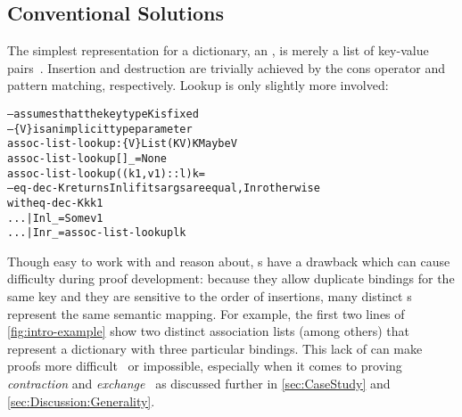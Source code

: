\subsection{Conventional Solutions}




The simplest representation for a dictionary, an \emph{\sal}, is merely a list of key-value pairs~\citep[Lists]{Pierce:SF1}.
%
Insertion and destruction are trivially achieved by the cons operator and pattern matching, respectively.
%
Lookup is only slightly more involved:
%
\begin{alltt}
  -- assumes that the key type K is fixed
  -- \altFAll\{V\} is an implicit type parameter
  assoc-list-lookup : \altFAll\{V\} \altRArr List (K \altTimes V) \altRArr K \altRArr Maybe V
  assoc-list-lookup [] \_ = None
  assoc-list-lookup ((k1 , v1) :: l) k =
    -- eq-dec-K returns Inl if its args are equal, Inr otherwise
    with eq-dec-K k k1
  ... | Inl \_ = Some v1
  ... | Inr \_ = assoc-list-lookup l k
\end{alltt}

Though easy to work with and reason about, \sal{}s have a drawback which can cause difficulty during proof development:
%
because they allow duplicate bindings for the same key and they are sensitive to the order of insertions, many distinct \sal{}s represent the same semantic mapping.
%
For example, the first two lines of \autoref{fig:intro-example}
%
show two distinct association lists (among others) that represent a dictionary with three particular bindings.
%
This lack of \firstUseGoal{\Extensional} can make proofs more difficult~\cite[Maps]{Pierce:SF1} or impossible, especially when it comes to proving \emph{contraction} and \emph{exchange}~\citep{StructProp}
%
as discussed further in \autoref{sec:CaseStudy} and \autoref{sec:Discussion:Generality}.


\parahead{\Cals}

